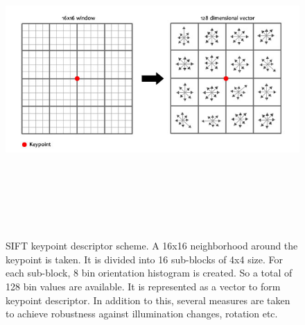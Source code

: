 \begin{figure} \label{s2}
		\centering
		\includegraphics[width=12cm,height=12cm,keepaspectratio]{Figures/sift10}
		\caption[SIFT kp descriptor example]
		{SIFT keypoint descriptor scheme. A 16x16 neighborhood around the keypoint is taken. It is divided into 16 sub-blocks of 4x4 size. For each sub-block, 8 bin orientation histogram is created. So a total of 128 bin values are available. It is represented as a vector to form keypoint descriptor. In addition to this, several measures are taken to achieve robustness against illumination changes, rotation etc.}
\end{figure}

